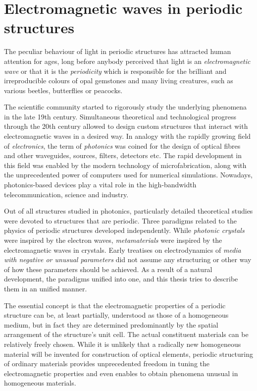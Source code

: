 
\section{Electromagnetic waves in periodic structures} %
The peculiar behaviour of light in periodic structures has attracted human attention for ages, long before anybody perceived that light is an \textit{electromagnetic wave} or that it is the \textit{periodicity} which is responsible for the brilliant and irreproducible colours of opal gemstones and many living creatures, such as various beetles, butterflies or peacocks. 

The scientific community started to rigorously study the underlying phenomena in the late 19th century.
Simultaneous theoretical and technological progress through the 20th century allowed to design custom structures that interact with electromagnetic waves in a desired way. In analogy with the rapidly growing field of \textit{electronics}, the term of \textit{photonics} was coined for the design of optical fibres and other waveguides, sources, filters, detectors etc. The rapid development in this field was enabled by the modern technology of microfabrication, along with the unprecedented power of computers used for numerical simulations. Nowadays, photonics-based devices play a vital role in the high-bandwidth telecommunication, science and industry.

Out of all structures studied in photonics, particularly detailed theoretical studies were devoted to structures that are periodic. Three paradigms related to the physics of periodic structures developed independently. While \textit{photonic crystals} were inspired by the electron waves, \textit{metamaterials} were inspired by the electromagnetic waves in crystals. Early treatises on electrodynamics of \textit{media with negative or unusual parameters} did not assume any structuring or other way of how these parameters should be achieved. As a result of a natural development, the paradigms unified into one, and this thesis tries to describe them in an unified manner.  %

The essential concept is that the electromagnetic properties of a periodic structure can be, at least partially, understood as those of a homogeneous medium, but in fact they are determined predominantly by the spatial arrangement of the structure's unit cell. The actual constituent materials can be relatively freely chosen. While it is unlikely that a radically new homogeneous material will be invented for construction of optical elements, periodic structuring of ordinary materials provides unprecedented freedom in tuning the electromagnetic properties and even enables to obtain phenomena unusual in homogeneous materials.  %

